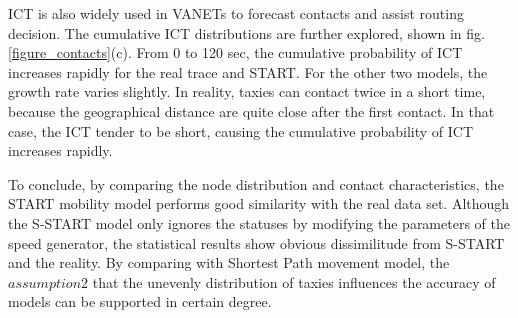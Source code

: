 ICT is also widely used in VANETs to forecast contacts and assist routing decision. The cumulative ICT distributions are further explored, shown in fig.\ref{figure_contacts}(c).
From 0 to 120 sec, the cumulative probability of ICT increases rapidly for the real trace and START. For the other two models, the growth rate varies slightly. In reality, taxies can contact twice in a short time, because the geographical distance are quite close after the first contact. In that case, the ICT tender to be short, causing the cumulative probability of ICT increases rapidly.

To conclude, by comparing the node distribution and contact characteristics, the START mobility model performs good similarity with the real data set. Although the S-START model only ignores the statuses by modifying the parameters of the speed generator, the statistical results show obvious dissimilitude from S-START and the reality. By comparing with Shortest Path movement model, the $assumption 2$ that the unevenly distribution of taxies influences the accuracy of models can be supported in certain degree.
